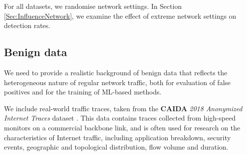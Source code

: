 \documentclass[runningheads,11pt]{llncs}\usepackage[]{graphicx}\usepackage[]{color}
\begin{document}
For all datasets, we randomise network settings. In Section \ref{Sec:InfluenceNetwork}, we examine the effect of extreme network settings on detection rates. 



 
\subsection{Benign data}

We need to provide a realistic background of benign data that reflects the heterogeneous nature of regular network traffic, both for evaluation of false positives and for the training of ML-based methods.

We include real-world traffic traces, taken from the \textbf{CAIDA} \textit{2018 Anonymized Internet Traces} dataset \cite{CAIDA2018}. This data contains traces collected from high-speed monitors on a commercial backbone link, and is often used for research on the characteristics of Internet traffic, including application breakdown, security events, geographic and topological distribution, flow volume and duration.
\end{document}
